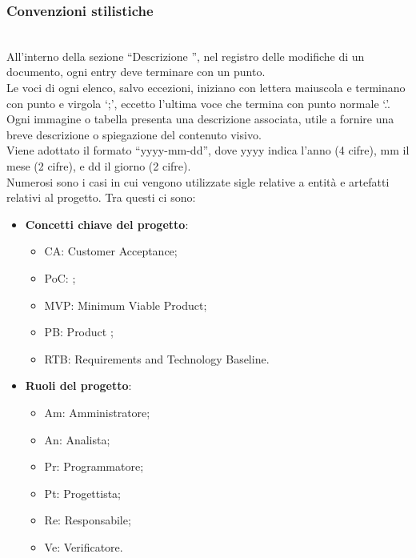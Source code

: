 \subsubsection{Convenzioni stilistiche}
\\
All'interno della sezione ``Descrizione '', nel registro delle modifiche di un documento, ogni entry deve terminare con un punto.
\\
Le voci di ogni elenco, salvo eccezioni, iniziano con lettera maiuscola e terminano con punto e virgola `;', eccetto l'ultima voce che termina con punto normale `.'.
\\
Ogni immagine o tabella presenta una descrizione associata, utile a fornire una breve descrizione o spiegazione del contenuto visivo.
\\
Viene adottato il formato “yyyy-mm-dd”, dove yyyy indica l'anno (4 cifre), mm il mese (2 cifre), e dd il giorno (2 cifre).
\\
Numerosi sono i casi in cui vengono utilizzate sigle relative a entità e artefatti relativi al progetto. Tra questi ci sono:
\begin{itemize}
    \item \textbf{Concetti chiave del progetto}:
        \begin{itemize}
            \item CA: Customer Acceptance;
            \item PoC: ;
            \item MVP: Minimum Viable Product;
            \item PB: Product ;
            \item RTB: Requirements and Technology Baseline.
        \end{itemize}
    \item \textbf{Ruoli del progetto}:
        \begin{itemize}
            \item Am: Amministratore;
            \item An: Analista;
            \item Pr: Programmatore;
            \item Pt: Progettista;
            \item Re: Responsabile;
            \item Ve: Verificatore.
        \end{itemize}
\end{itemize}

